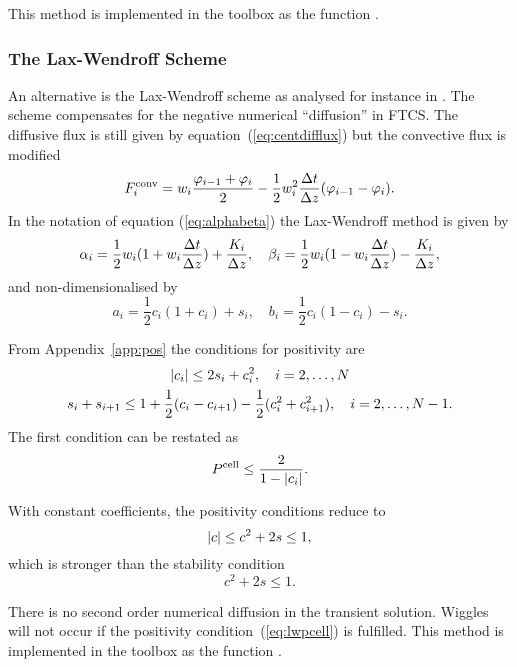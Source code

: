 This method is implemented in the toolbox as the function .

\subsubsection{The Lax-Wendroff Scheme}

An alternative is the Lax-Wendroff scheme as analysed for instance in
\cite{vreu93b}. The scheme compensates for the negative numerical
``diffusion'' in FTCS.  The diffusive flux is still given by
equation~(\ref{eq:centdifflux}) but the convective flux is modified
\begin{equation}\label{eq:lwflux}
  F^{\mathrm{conv}}_i = w_i \frac{\varphi_{i-1} + \varphi_i}{2}
      - \frac{1}{2} w_i^2 \frac{\Delta t}{\Delta z} 
       (\varphi_{i-1} -\varphi_i) .
\end{equation}
In the notation of equation (\ref{eq:alphabeta}) the Lax-Wendroff
method is given by
\begin{equation}
   \alpha_i = \frac{1}{2} w_i(1+w_i\frac{\Delta t}{\Delta z}) + \frac{K_i}{\Delta z} , \quad 
   \beta_i  = \frac{1}{2} w_i(1-w_i\frac{\Delta t}{\Delta z}) - \frac{K_i}{\Delta z} ,
\end{equation}
and non-dimensionalised by
\begin{equation}
   a_i = \frac{1}{2} c_i(1+c_i) + s_i , \quad 
   b_i = \frac{1}{2} c_i(1-c_i) - s_i .
\end{equation}

From Appendix~\ref{app:pos} the conditions for positivity are
\begin{gather}
     |c_i| \le 2 s_i + c_i^2,  \quad i = 2, \dots, N \\
     s_i + s_{i+1} \le 1 + \frac{1}{2} (c_i - c_{i+1}) - \frac{1}{2}(c_i^2 + c_{i+1}^2),
               \quad i = 2, \dots, N-1.
\end{gather}
The first condition can be restated as 
\begin{equation}\label{eq:lwpcell}
    P^{\mathrm{cell}} \le \frac{2}{1-|c_i|} .
\end{equation}

With constant coefficients, the positivity
conditions reduce to
\begin{equation}
 |c| \le c^2 + 2 s \le 1,
\end{equation}
which is stronger than the stability condition
\begin{equation}
  c^2 + 2 s \le 1 .
\end{equation}

There is no second order numerical diffusion in the transient
solution.  Wiggles will not occur if the positivity
condition~(\ref{eq:lwpcell}) is fulfilled.
This method is implemented in the toolbox as the function .

